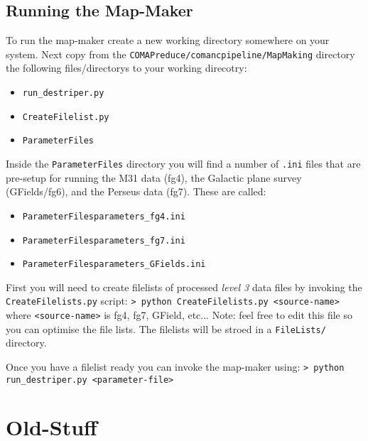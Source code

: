 \documentclass[11pt]{article}
\begin{document}
\subsection{Running the Map-Maker}

To run the map-maker create a new working directory somewhere on your system. Next copy from the \texttt{COMAPreduce/comancpipeline/MapMaking} directory the following files/directorys to your working direcotry:
\begin{itemize}
  \item \texttt{run\_destriper.py}
  \item \texttt{CreateFilelist.py}
  \item \texttt{ParameterFiles}
\end{itemize}

Inside the \texttt{ParameterFiles} directory you will find a number of \texttt{.ini} files that are pre-setup for running the M31 data (fg4), the Galactic plane survey (GFields/fg6), and the Perseus data (fg7). These are called:
\begin{itemize}
\item \texttt{ParameterFiles\/parameters\_fg4.ini}
\item \texttt{ParameterFiles\/parameters\_fg7.ini}
\item \texttt{ParameterFiles\/parameters\_GFields.ini}
\end{itemize}

First you will need to create filelists of processed \textit{level 3} data files by invoking the \texttt{CreateFilelists.py} script:
\newline\noindent
\texttt{> python CreateFilelists.py <source-name>}
\newline\noindent
where \texttt{<source-name>} is fg4, fg7, GField, etc... Note: feel free to edit this file so you can optimise the file lists. The filelists will be stroed in a \texttt{FileLists/} directory.

Once you have a filelist ready you can invoke the map-maker using:
\newline\noindent
\texttt{> python run\_destriper.py <parameter-file>}
\newline\noindent


\section{Old-Stuff}
\end{document}
